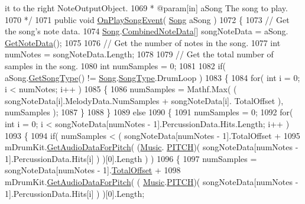 \begin{DoxyCodeInclude}
{       it to the right NoteOutputObject.}
1069 \textcolor{comment}{     * @param[in] aSong The song to play.  }
1070 \textcolor{comment}{    */}
1071     \textcolor{keyword}{public} \textcolor{keywordtype}{void} \hyperlink{group___v_i_m_handlers_ga7fd877a7d429403abbfd2728aa63c056}{OnPlaySongEvent}( \hyperlink{class_song}{Song} aSong )
1072     \{
1073         \textcolor{comment}{// Get the song's note data.}
1074         \hyperlink{class_song}{Song}.\hyperlink{group___song_structs_struct_song_1_1_combined_note_data}{CombinedNoteData}[] songNoteData = aSong.
      \hyperlink{group___song_pub_func_gae3df1fd5448b7d9cefb0fed4af967985}{GetNoteData}();
1075 
1076         \textcolor{comment}{// Get the number of notes in the song.}
1077         \textcolor{keywordtype}{int} numNotes = songNoteData.Length;
1078 
1079         \textcolor{comment}{// Get the total number of samples in the song.}
1080         \textcolor{keywordtype}{int} numSamples = 0;
1081 
1082         \textcolor{keywordflow}{if}( aSong.\hyperlink{group___song_pub_func_gabae5b5d8f727b2d9da7867a99347f86b}{GetSongType}() != \hyperlink{class_song}{Song}.\hyperlink{group___song_enums_gae681a1f001333e39fc1cb4fea97bfe1b}{SongType}.DrumLoop )
1083         \{
1084             \textcolor{keywordflow}{for}( \textcolor{keywordtype}{int} i = 0; i < numNotes; i++ )
1085             \{
1086                 numSamples = Mathf.Max( ( songNoteData[i].MelodyData.NumSamples + songNoteData[i].
      TotalOffset ), numSamples );
1087             \}
1088         \}
1089         \textcolor{keywordflow}{else}
1090         \{
1091             numSamples = 0;
1092             \textcolor{keywordflow}{for}( \textcolor{keywordtype}{int} i = 0; i < songNoteData[numNotes - 1].PercussionData.Hits.Length; i++ )
1093             \{
1094                 \textcolor{keywordflow}{if}( numSamples < ( songNoteData[numNotes - 1].TotalOffset +
1095                     mDrumKit.\hyperlink{group___v_i_base_pub_func_gaf715f7c3bbd2f1a2fa543b2f0684f8a6}{GetAudioDataForPitch}( (\hyperlink{class_music}{Music}.
      \hyperlink{group___music_enums_ga508f69b199ea518f935486c990edac1d}{PITCH})( songNoteData[numNotes - 1].PercussionData.Hits[i] ) )[0].Length ) )
1096                 \{
1097                     numSamples = songNoteData[numNotes - 1].\hyperlink{group___song_structs_a9a0f4830f464d3c7e7f4f156ce490cec}{TotalOffset} +
1098                         mDrumKit.\hyperlink{group___v_i_base_pub_func_gaf715f7c3bbd2f1a2fa543b2f0684f8a6}{GetAudioDataForPitch}( (
      \hyperlink{class_music}{Music}.\hyperlink{group___music_enums_ga508f69b199ea518f935486c990edac1d}{PITCH})( songNoteData[numNotes - 1].PercussionData.Hits[i] ) )[0].Length;

\end{DoxyCodeInclude}
